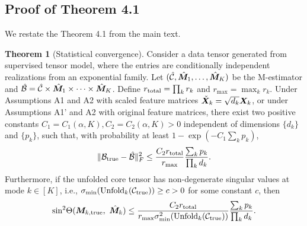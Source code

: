 \documentclass[12pt]{article}
\theoremstyle{definition}
\newtheorem{thm}{Theorem}[section]
\theoremstyle{definition}
\begin{document}
\subsection{Proof of Theorem 4.1}
We restate the Theorem 4.1 from the main text. 
 \begin{thm}[Statistical convergence]\label{thm:main}
Consider a data tensor generated from supervised tensor model, where the entries are conditionally independent realizations from an exponential family. Let $(\hat {\mathcal{C}}, \hat {\bm M}_1,\ldots,\hat {\bm M}_K)$ be the M-estimator and $\hat {\mathcal{B}}=\hat {\mathcal{C}}\times \hat {\bm M}_1\times\cdots \times \hat {\bm M}_K$. Define $r_\textup{total}=\prod_k r_k$ and $r_{\max}=\max_k r_k$. Under Assumptions A1 and A2 with scaled feature matrices $\check {\bm X}_k= \sqrt{d_k}\bm X_k$, or under Assumptions A1' and A2 with original feature matrices, there exist two positive constants $C_1=C_1(\alpha,K), C_2=C_2(\alpha, K)>0$ independent of dimensions $\{d_k\}$ and $\{p_k\}$, such that, with probability at least $1-\exp(-C_1\sum_k p_k)$, 
\begin{equation}\label{eq:bound}
    \lVert\mathcal{B}_{\textup{true}}- \hat {\mathcal{B}}\rVert_F^2\leq \frac{ C_{2} r_{\textup{total}}}{r_{\max}}\frac{\sum_k p_k}{\prod_k d_k}.
\end{equation}
Furthermore, if the unfolded core tensor has non-degenerate singular values at mode $k\in[K]$, i.e., $\sigma_{\min}(\textup{Unfold}_k(\mathcal{C}_\textup{true})) \geq c>0$ for some constant $c$, then
\begin{equation}\label{eq:sinebound}
\textup{sin}^2 \Theta(\bm M_{k,\textup{true}},\ \hat {\bm M}_k) \leq  \frac{ C_{2}r_{\textup{total}}}{ r_{\max}\sigma^2_{\min}(\textup{Unfold}_k(\mathcal{C}_\textup{true}))}\frac{\sum_k p_k}{\prod_k d_k}.
\end{equation}
\end{thm}
\end{document}
